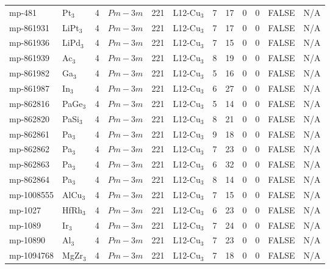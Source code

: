 {\begin{longtable}{llcccccccccc}
    mp-481 & Pt$_{3}$ & 4     & $Pm-3m$ & 221   & L12-Cu$_{3}$ & 7     & 17    & 0     & 0     & FALSE & N/A \\
    mp-861931 & LiPt$_{3}$ & 4     & $Pm-3m$ & 221   & L12-Cu$_{3}$ & 7     & 17    & 0     & 0     & FALSE & N/A \\
    mp-861936 & LiPd$_{3}$ & 4     & $Pm-3m$ & 221   & L12-Cu$_{3}$ & 7     & 15    & 0     & 0     & FALSE & N/A \\
    mp-861939 & Ac$_{3}$ & 4     & $Pm-3m$ & 221   & L12-Cu$_{3}$ & 8     & 19    & 0     & 0     & FALSE & N/A \\
    mp-861982 & Ga$_{3}$ & 4     & $Pm-3m$ & 221   & L12-Cu$_{3}$ & 5     & 16    & 0     & 0     & FALSE & N/A \\
    mp-861987 & In$_{3}$ & 4     & $Pm-3m$ & 221   & L12-Cu$_{3}$ & 6     & 27    & 0     & 0     & FALSE & N/A \\
    mp-862816 & PaGe$_{3}$ & 4     & $Pm-3m$ & 221   & L12-Cu$_{3}$ & 5     & 14    & 0     & 0     & FALSE & N/A \\
    mp-862820 & PaSi$_{3}$ & 4     & $Pm-3m$ & 221   & L12-Cu$_{3}$ & 8     & 21    & 0     & 0     & FALSE & N/A \\
    mp-862861 & Pa$_{3}$ & 4     & $Pm-3m$ & 221   & L12-Cu$_{3}$ & 9     & 18    & 0     & 0     & FALSE & N/A \\
    mp-862862 & Pa$_{3}$ & 4     & $Pm-3m$ & 221   & L12-Cu$_{3}$ & 7     & 23    & 0     & 0     & FALSE & N/A \\
    mp-862863 & Pa$_{3}$ & 4     & $Pm-3m$ & 221   & L12-Cu$_{3}$ & 6     & 32    & 0     & 0     & FALSE & N/A \\
    mp-862864 & Pa$_{3}$ & 4     & $Pm-3m$ & 221   & L12-Cu$_{3}$ & 8     & 14    & 0     & 0     & FALSE & N/A \\
    mp-1008555 & AlCu$_{3}$ & 4     & $Pm-3m$ & 221   & L12-Cu$_{3}$ & 7     & 15    & 0     & 0     & FALSE & N/A \\
    mp-1027 & HfRh$_{3}$ & 4     & $Pm-3m$ & 221   & L12-Cu$_{3}$ & 6     & 23    & 0     & 0     & FALSE & N/A \\
    mp-1089 & Ir$_{3}$ & 4     & $Pm-3m$ & 221   & L12-Cu$_{3}$ & 7     & 24    & 0     & 0     & FALSE & N/A \\
    mp-10890 & Al$_{3}$ & 4     & $Pm-3m$ & 221   & L12-Cu$_{3}$ & 7     & 23    & 0     & 0     & FALSE & N/A \\
    mp-1094768 & MgZr$_{3}$ & 4     & $Pm-3m$ & 221   & L12-Cu$_{3}$ & 7     & 18    & 0     & 0     & FALSE & N/A \\

\end{longtable}}
